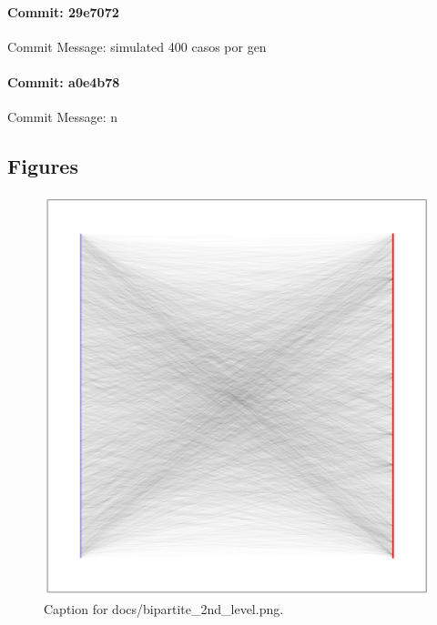 \documentclass{article}
\begin{document}
\paragraph{Commit: 29e7072}
Commit Message: simulated 400 casos por gen

\paragraph{Commit: a0e4b78}
Commit Message: n

\subsection{Figures}
\begin{figure}[h] \centering \includegraphics{docs/bipartite_2nd_level.png} \caption{Caption for docs/bipartite_2nd_level.png.} \end{figure}
\end{document}
